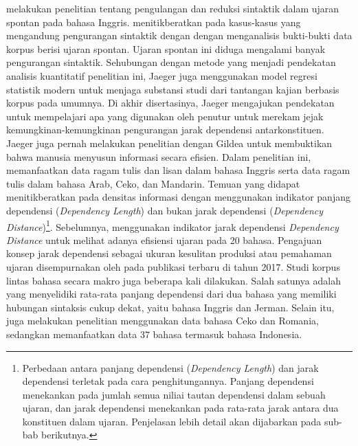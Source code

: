 \cite{jaeger2006redundancy} melakukan penelitian tentang pengulangan dan reduksi sintaktik dalam ujaran spontan pada bahasa Inggris. \cite{jaeger2006redundancy}  menitikberatkan pada kasus-kasus yang mengandung pengurangan sintaktik dengan dengan menganalisis bukti-bukti data korpus berisi ujaran spontan. Ujaran spontan ini diduga mengalami banyak pengurangan sintaktik. Sehubungan dengan metode yang menjadi pendekatan analisis kuantitatif penelitian ini, Jaeger juga menggunakan model regresi statistik modern untuk menjaga substansi studi dari tantangan kajian berbasis korpus pada umumnya. Di akhir disertasinya, Jaeger mengajukan pendekatan untuk mempelajari apa yang digunakan oleh penutur untuk merekam jejak kemungkinan-kemungkinan pengurangan jarak dependensi antarkonstituen. Jaeger juga pernah melakukan penelitian dengan Gildea \citep{gildea2015human} untuk membuktikan bahwa manusia menyusun informasi secara efisien. Dalam penelitian ini, \cite{gildea2015human} memanfaatkan data ragam tulis dan lisan dalam bahasa Inggris serta data ragam tulis dalam bahasa Arab, Ceko, dan Mandarin. Temuan yang didapat menitikberatkan pada densitas informasi dengan menggunakan indikator panjang dependensi (\textit{Dependency Length}) dan bukan jarak dependensi (\textit{Dependency Distance})\footnote{Perbedaan antara panjang dependensi (\textit{Dependency Length}) dan jarak dependensi terletak pada cara penghitungannya. Panjang dependensi menekankan pada jumlah semua niliai tautan dependensi dalam sebuah ujaran, dan jarak dependensi menekankan pada rata-rata jarak antara dua konstituen dalam ujaran. Penjelasan lebih detail akan dijabarkan pada sub-bab berikutnya.}. Sebelumnya, \cite{liu2008dependency} menggunakan indikator jarak dependensi {\textit{Dependency Distance}} untuk melihat adanya efisiensi ujaran pada 20 bahasa. Pengajuan konsep jarak dependensi sebagai ukuran kesulitan produksi atau pemahaman ujaran disempurnakan oleh \cite{liu2017dependency} pada publikasi terbaru di tahun 2017. Studi korpus lintas bahasa secara makro juga beberapa kali dilakukan. Salah satunya adalah \cite{gildea2010grammars} yang menyelidiki rata-rata panjang dependensi dari dua bahasa yang memiliki hubungan sintaksis cukup dekat, yaitu bahasa Inggris dan Jerman. Selain itu, \cite{i2004euclidean} juga melakukan penelitian menggunakan data bahasa Ceko dan Romania, sedangkan \cite{futrell2015large} memanfaatkan data 37 bahasa termasuk bahasa Indonesia.

